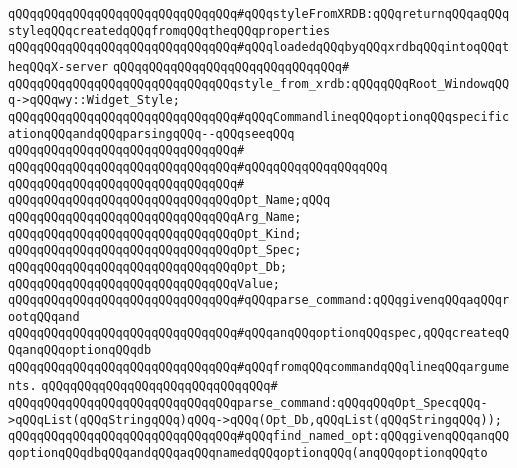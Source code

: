 \newline
\verb|qQQqqQQqqQQqqQQqqQQqqQQqqQQqqQQq#qQQqstyleFromXRDB:qQQqreturnqQQqaqQQqstyleqQQqcreatedqQQqfromqQQqtheqQQqproperties|\newline
\verb|qQQqqQQqqQQqqQQqqQQqqQQqqQQqqQQq#qQQqloadedqQQqbyqQQqxrdbqQQqintoqQQqtheqQQqX-server|\newline
\verb|qQQqqQQqqQQqqQQqqQQqqQQqqQQqqQQq#|\newline
\verb|qQQqqQQqqQQqqQQqqQQqqQQqqQQqqQQqstyle_from_xrdb:qQQqqQQqRoot_WindowqQQq->qQQqwy::Widget_Style;|\newline
\newline
\verb|qQQqqQQqqQQqqQQqqQQqqQQqqQQqqQQq#qQQqCommandlineqQQqoptionqQQqspecificationqQQqandqQQqparsingqQQq--qQQqseeqQQq|\newline
\verb|qQQqqQQqqQQqqQQqqQQqqQQqqQQqqQQq#|\newline
\verb|qQQqqQQqqQQqqQQqqQQqqQQqqQQqqQQq#qQQqqQQqqQQqqQQqqQQq|\newline
\verb|qQQqqQQqqQQqqQQqqQQqqQQqqQQqqQQq#|\newline
\verb|qQQqqQQqqQQqqQQqqQQqqQQqqQQqqQQqOpt_Name;qQQq|\newline
\verb|qQQqqQQqqQQqqQQqqQQqqQQqqQQqqQQqArg_Name;|\newline
\verb|qQQqqQQqqQQqqQQqqQQqqQQqqQQqqQQqOpt_Kind;|\newline
\verb|qQQqqQQqqQQqqQQqqQQqqQQqqQQqqQQqOpt_Spec;|\newline
\verb|qQQqqQQqqQQqqQQqqQQqqQQqqQQqqQQqOpt_Db;|\newline
\verb|qQQqqQQqqQQqqQQqqQQqqQQqqQQqqQQqValue;|\newline
\newline
\verb|qQQqqQQqqQQqqQQqqQQqqQQqqQQqqQQq#qQQqparse_command:qQQqgivenqQQqaqQQqrootqQQqand|\newline
\verb|qQQqqQQqqQQqqQQqqQQqqQQqqQQqqQQq#qQQqanqQQqoptionqQQqspec,qQQqcreateqQQqanqQQqoptionqQQqdb|\newline
\verb|qQQqqQQqqQQqqQQqqQQqqQQqqQQqqQQq#qQQqfromqQQqcommandqQQqlineqQQqarguments.|\newline
\verb|qQQqqQQqqQQqqQQqqQQqqQQqqQQqqQQq#|\newline
\verb|qQQqqQQqqQQqqQQqqQQqqQQqqQQqqQQqparse_command:qQQqqQQqOpt_SpecqQQq->qQQqList(qQQqStringqQQq)qQQq->qQQq(Opt_Db,qQQqList(qQQqStringqQQq));|\newline
\newline
\verb|qQQqqQQqqQQqqQQqqQQqqQQqqQQqqQQq#qQQqfind_named_opt:qQQqgivenqQQqanqQQqoptionqQQqdbqQQqandqQQqaqQQqnamedqQQqoptionqQQq(anqQQqoptionqQQqto|\newline
